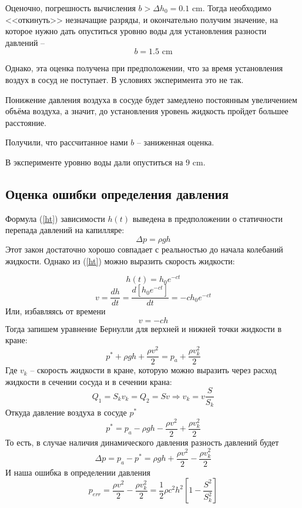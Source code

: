 \documentclass[a4paper,12pt]{article}%
\begin{document}
Оценочно, погрешность вычисления $b>\Delta h_0=0.1 \text{ cm}$. Тогда необходимо <<откинуть>> незначащие разряды, и окончательно получим значение, на которое нужно дать опуститься уровню воды для установления разности давлений -- 
\begin{equation}
	b=1.5 \text{ cm}
\end{equation}

Однако, эта оценка получена при предположении, что за время установления воздух в сосуд не поступает.
В условиях эксперимента это не так. 

Понижение давления воздуха в сосуде будет замедлено постоянным увеличением объёма воздуха, а значит, до установления уровень жидкость пройдет большее расстояние.

Получили, что рассчитанное нами $b$ -- заниженная оценка. 

В эксперименте уровню воды дали опуститься на $9\text{ cm}$.


\subsection{Оценка ошибки определения давления}

Формула (\ref{ht}) зависимости $h(t)$ выведена в предположении о статичности перепада давлений на капилляре:
\begin{equation}
	\Delta p = \rho g h
\end{equation}
Этот закон достаточно хорошо совпадает с реальностью до начала колебаний жидкости. Однако из (\ref{ht}) можно выразить скорость жидкости:

\begin{equation}
	h(t)=h_0e^{-ct}
\end{equation}
\begin{equation}
	v=\frac{dh}{dt}=\frac{d[h_0e^{-ct}]}{dt}=-ch_0e^{-ct}
\end{equation}
Или, избавляясь от времени
\begin{equation}
	v=-ch
\end{equation}
Тогда запишем уравнение Бернулли для верхней и нижней точки жидкости в кране:
\begin{equation}
	p^*+\rho g h +\frac{\rho v^2}{2}=p_a+\frac{\rho v_k^2}{2}
\end{equation}
Где $v_k$ -- скорость жидкости в кране, которую можно выразить через расход жидкости в сечении сосуда и в сечении крана:
\begin{equation}
	Q_1=S_kv_k=Q_2=Sv \Rightarrow v_k = v\frac{S}{S_k}
\end{equation}
Откуда давление воздуха в сосуде $p^*$
\begin{equation}
	p^*=p_a-\rho g h-\frac{\rho v^2}{2}+\frac{\rho v_k^2}{2}
\end{equation}
То есть, в случае наличия динамического давления разность давлений будет
\begin{equation}
	\Delta p = p_a-p^*=\rho g h+\frac{\rho v^2}{2}-\frac{\rho v_k^2}{2}
\end{equation}
И наша ошибка в определении давления
\begin{equation}
	p_{err}=\frac{\rho v^2}{2}-\frac{\rho v_k^2}{2}=\frac12\rho c^2h^2[1-\frac{S^2}{S^2_k}]
\end{equation}
\end{document}
